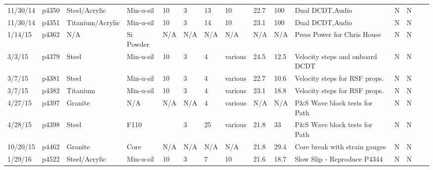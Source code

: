 \begin{landscape}
\begin{longtable}{lllllllllllllll}
11/30/14 & p4350      & Steel/Acrylic    & Min-u-sil    & 10           & 3         & 13            & 10                           & 22.7        & 100      & Dual DCDT,Audio                                 & N     & N    &  &  \\
11/30/14 & p4351      & Titanium/Acrylic & Min-u-sil    & 10           & 3         & 14            & 10                           & 23.1        & 100      & Dual DCDT,Audio                                 & N     & N    &  &  \\
1/14/15  & p4362      & N/A              & Si Powder    & N/A          & N/A       & N/A           & N/A                          & N/A         & N/A      & Press Power for Chris House                     & N     & N    &  &  \\
3/3/15   & p4379      & Steel            & Min-u-sil    & 10           & 3         & 4             & various                      & 24.5        & 12.5     & Velocity steps and onboard DCDT                 & N     & N    &  &  \\
3/7/15   & p4381      & Steel            & Min-u-sil    & 10           & 3         & 4             & various                      & 22.7        & 10.6     & Velocity steps for RSF props.                   & N     & N    &  &  \\
3/7/15   & p4382      & Titanium         & Min-u-sil    & 10           & 3         & 4             & various                      & 23.1        & 18.8     & Velocity steps for RSF props.                   & N     & N    &  &  \\
4/27/15  & p4397      & Granite          & N/A          & N/A          & N/A       & 4             & various                      & N/A         & N/A      & P\&S Wave block tests for Path                  & N     & N    &  &  \\
4/28/15  & p4398      & Steel            & F110         &              & 3         & 25            & various                      & 21.8        & 33       & P\&S Wave block tests for Path                  & N     & N    &  &  \\
10/20/15 & p4462      & Granite          & Core         & N/A          & N/A       & N/A           & N/A                          & 21.8        & 29.4     & Core break with strain gauges                   & N     & N    &  &  \\
1/29/16  & p4522      & Steel/Acrylic    & Min-u-sil    & 10           & 3         & 7             & 10                           & 21.6        & 18.7     & Slow Slip - Reproduce P4344                     & N     & N    &  &  \\

\end{longtable}
\end{landscape}
